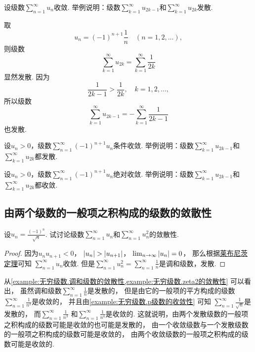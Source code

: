 \begin{example}
设级数\(\sum_{n=1}^\infty u_n\)收敛.
举例说明：级数\(\sum_{k=1}^\infty u_{2k-1}\)和\(\sum_{k=1}^\infty u_{2k}\)发散.
\begin{solution}
取\[
	u_n = (-1)^{n+1} \frac1n
	\quad(n=1,2,\dotsc),
\]
则级数\[
	\sum_{k=1}^\infty u_{2k}
	= \sum_{k=1}^\infty \frac1{2k}
\]显然发散.
因为\[
	\frac1{2k-1} > \frac1{2k},
	\quad k=1,2,\dotsc,
\]
所以级数\[
	\sum_{k=1}^\infty u_{2k-1}
	= -\sum_{k=1}^\infty \frac1{2k-1}
\]也发散.
\end{solution}
\end{example}

\begin{example}
设\(u_n>0\)，级数\(\sum_{n=1}^\infty (-1)^{n+1} u_n\)条件收敛.
举例说明：级数\(\sum_{k=1}^\infty u_{2k-1}\)和\(\sum_{k=1}^\infty u_{2k}\)都发散.
\end{example}

\begin{example}
设\(u_n>0\)，级数\(\sum_{n=1}^\infty (-1)^{n+1} u_n\)绝对收敛.
举例说明：级数\(\sum_{k=1}^\infty u_{2k-1}\)和\(\sum_{k=1}^\infty u_{2k}\)都收敛.
\end{example}

\subsection{由两个级数的一般项之积构成的级数的敛散性}
\begin{example}\label{example:交错级数.逐项平方以后发散的特例}
设\(u_n = \frac{(-1)^n}{\sqrt{n}}\).
试讨论级数\(\sum_{n=1}^\infty u_n\)和\(\sum_{n=1}^\infty u_n^2\)的敛散性.
\begin{proof}
因为\(u_n u_{n+1} < 0\)，
\(\abs{u_n} > \abs{u_{n+1}}\)，
\(\lim_{n\to\infty} \abs{u_n} = 0\)，
那么根据\hyperref[theorem:无穷级数.莱布尼茨定理]{莱布尼茨定理}可知
\(\sum_{n=1}^\infty u_n\)收敛.
但是\(\sum_{n=1}^\infty u_n^2
= \sum_{n=1}^\infty \frac{1}{n}\)是调和级数，发散.
\end{proof}
\end{example}

从\cref{example:无穷级数.调和级数的敛散性,example:无穷级数.zeta2的敛散性} 可以看出，
虽然调和级数\(\sum_{n=1}^\infty \frac1n\)是发散的，
但是由它的一般项的平方构成的级数\(\sum_{n=1}^\infty \frac1{n^2}\)是收敛的，
并且由\cref{example:无穷级数.p级数的收敛性} 可知
\(\sum_{n=1}^\infty \frac1{\sqrt{n}}\)是发散的，
而\(\sum_{n=1}^\infty \frac1{n^3}\)
和\(\sum_{n=1}^\infty \frac1{n^4}\)是收敛的.
这就说明，由两个发散级数的一般项之积构成的级数可能是收敛的也可能是发散的，
由一个收敛级数与一个发散级数的一般项之积构成的级数可能是收敛的，
由两个收敛级数的一般项之积构成的级数可能是收敛的.

